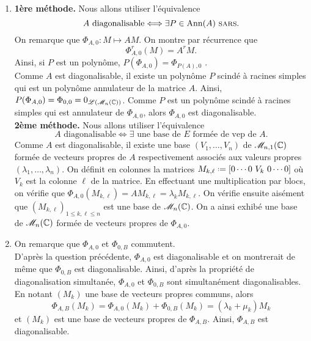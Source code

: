 \begin{solution}
    \begin{enumerate}
        \item \textbf{1ère méthode.} Nous allons utiliser l'équivalence
        $$A \text{ diagonalisable} \Longleftrightarrow \exists P \in \mathrm{Ann}(A) \text{ \textsc{sars}}.$$
        On remarque que $\Phi_{A, 0}: M \mapsto AM$. On montre par récurrence que 
        $$\Phi_{A, 0}^r(M) = A^r M.$$
        Ainsi, si $P$ est un polynôme, $P(\Phi_{A, 0}) = \Phi_{P(A), 0}$ \note. \\
        Comme $A$ est diagonalisable, il existe un polynôme $P$ scindé à racines simples qui est un polynôme annulateur de la matrice $A$. Ainsi, $P(\Phi_{A, 0}) = \Phi_{0, 0} = 0_{\mathscr{L} \left( \mathscr{M}_n(\mathbb{C}) \right)}$. Comme $P$ est un polynôme scindé à racines simples qui est annulateur de $\Phi_{A, 0}$, alors $\Phi_{A, 0}$ est diagonalisable. \\
        \textbf{2ème méthode.} Nous allons utiliser l'équivalence 
        $$A \text{  diagonalisable} \Longleftrightarrow \exists \text{ une base de $E$ formée de vep de $A$}.$$
        Comme $A$ est diagonalisable, il existe une base $(V_1, \dots, V_n)$ de $\mathscr{M}_{n,1}(\mathbb{C})$ formée de vecteurs propres de $A$ respectivement associés aux valeurs propres $(\lambda_1, \dots, \lambda_n)$. On définit en colonnes la matrices $M_{k, \ell} \defeq [ 0 \cdots 0\ V_k\ 0 \cdots 0]$ où $V_k$ est la colonne $\ell$ de la matrice. En effectuant une multiplication par blocs, on vérifie que $\Phi_{A, 0}(M_{k, \ell}) = A M_{k, \ell} = \lambda_k M_{k, \ell}$. On vérifie ensuite aisément que $(M_{k, \ell})_{1 \leqslant k, \ell \leqslant n}$ est une base de $\mathscr{M}_n(\mathbb{C})$. On a ainsi exhibé une base de $\mathscr{M}_n(\mathbb{C})$ formée de vecteurs propres de $\Phi_{A, 0}$. 
        \item On remarque que $\Phi_{A, 0}$ et $\Phi_{0, B}$ commutent. \\
        D'après la question précédente, $\Phi_{A, 0}$ est diagonalisable et on montrerait de même que $\Phi_{0, B}$ est diagonalisable. Ainsi, d'après la propriété de diagonalisation simultanée, $\Phi_{A, 0}$ et $\Phi_{0, B}$ sont simultanément diagonalisables. \\
        En notant $(M_k)$ une base de vecteurs propres communs, alors
        $$\Phi_{A, B} (M_k) = \Phi_{A, 0} (M_k) + \Phi_{0, B} (M_k) = (\lambda_k + \mu_k) M_k$$
        et $(M_k)$ est une base de vecteurs propres de $\Phi_{A, B}$. Ainsi, $\Phi_{A, B}$ est diagonalisable. 
    \end{enumerate}
\end{solution}